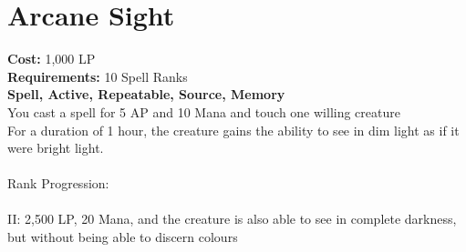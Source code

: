 \section{Arcane Sight}\label{spell:arcaneSight}
\textbf{Cost:} 1,000 LP\\
\textbf{Requirements:} 10 Spell Ranks\\
\textbf{Spell, Active, Repeatable, Source, Memory}\\
You cast a spell for 5 AP and 10 Mana and touch one willing creature\\
For a duration of 1 hour, the creature gains the ability to see in dim light as if it were bright light.\\
\\
Rank Progression:\\
\\
II: 2,500 LP, 20 Mana, and the creature is also able to see in complete darkness, but without being able to discern colours\\